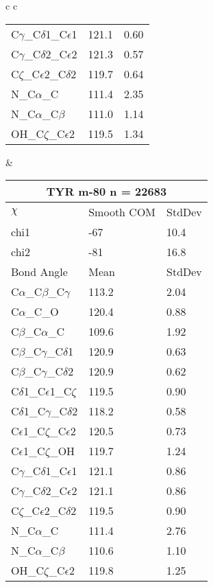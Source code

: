 \begin{longtable}{ c c }
\begin{tabular}{ l l l }
  C$\gamma$\_C$\delta$1\_C$\epsilon$1 & 121.1 & 0.60\\
  C$\gamma$\_C$\delta$2\_C$\epsilon$2 & 121.3 & 0.57\\
  C$\zeta$\_C$\epsilon$2\_C$\delta$2 & 119.7 & 0.64\\
  N\_C$\alpha$\_C & 111.4 & 2.35\\
  N\_C$\alpha$\_C$\beta$ & 111.0 & 1.14\\
  OH\_C$\zeta$\_C$\epsilon$2 & 119.5 & 1.34\\
  \bottomrule
  \end{tabular}
  &
  \begin{tabular}{ l l l }
  \toprule
  \multicolumn{3}{c}{TYR \textbf{m-80} n = 22683} \\ \toprule
  $\chi$       & Smooth COM & StdDev \\ \midrule
  chi1 & -67 & 10.4 \\ 
  chi2 & -81 & 16.8 \\ \midrule
  Bond Angle   & Mean     & StdDev \\ \midrule
  C$\alpha$\_C$\beta$\_C$\gamma$ & 113.2 & 2.04\\
  C$\alpha$\_C\_O & 120.4 & 0.88\\
  C$\beta$\_C$\alpha$\_C & 109.6 & 1.92\\
  C$\beta$\_C$\gamma$\_C$\delta$1 & 120.9 & 0.63\\
  C$\beta$\_C$\gamma$\_C$\delta$2 & 120.9 & 0.62\\
  C$\delta$1\_C$\epsilon$1\_C$\zeta$ & 119.5 & 0.90\\
  C$\delta$1\_C$\gamma$\_C$\delta$2 & 118.2 & 0.58\\
  C$\epsilon$1\_C$\zeta$\_C$\epsilon$2 & 120.5 & 0.73\\
  C$\epsilon$1\_C$\zeta$\_OH & 119.7 & 1.24\\
  C$\gamma$\_C$\delta$1\_C$\epsilon$1 & 121.1 & 0.86\\
  C$\gamma$\_C$\delta$2\_C$\epsilon$2 & 121.1 & 0.86\\
  C$\zeta$\_C$\epsilon$2\_C$\delta$2 & 119.5 & 0.90\\
  N\_C$\alpha$\_C & 111.4 & 2.76\\
  N\_C$\alpha$\_C$\beta$ & 110.6 & 1.10\\
  OH\_C$\zeta$\_C$\epsilon$2 & 119.8 & 1.25\\
  \bottomrule
  \end{tabular}
  \\
  
\end{longtable}

